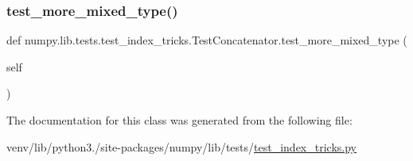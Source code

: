 \subsubsection{\texorpdfstring{test\+\_\+more\+\_\+mixed\+\_\+type()}{test\_more\_mixed\_type()}}
{\footnotesize\ttfamily def numpy.\+lib.\+tests.\+test\+\_\+index\+\_\+tricks.\+Test\+Concatenator.\+test\+\_\+more\+\_\+mixed\+\_\+type (\begin{DoxyParamCaption}\item[{}]{self }\end{DoxyParamCaption})}



The documentation for this class was generated from the following file\+:\begin{DoxyCompactItemize}
\item 
venv/lib/python3./site-\/packages/numpy/lib/tests/\hyperlink{test__index__tricks_8py}{test\+\_\+index\+\_\+tricks.\+py}\end{DoxyCompactItemize}
